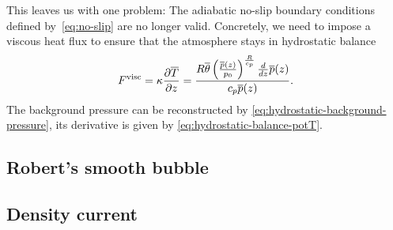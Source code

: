 This leaves us with one problem:
The adiabatic no-slip boundary conditions defined by~\vref{eq:no-slip} are no longer valid.
Concretely, we need to impose a viscous heat flux to ensure that the atmosphere stays in hydrostatic balance~\cite{giraldo2008study}
\begin{equation}
  \label{eq:atmosphere-bc}
  F^\text{visc} = \kappa \pdv{\overline{T}}{z} =
\frac{R \overline{\theta} \left(\frac{\overline{p}{\left (z \right )}}{p_{0}}\right)^{\frac{R}{c_{p}}} \frac{d}{d z} \overline{p}{\left (z \right )}}{c_{p} \overline{p}{\left (z \right )}}.
\end{equation}
The background pressure can be reconstructed by \cref{eq:hydrostatic-background-pressure}, its derivative is given by \cref{eq:hydrostatic-balance-potT}.

\subsection{Robert's smooth bubble}
\cite{robert1993bubble}
\subsection{Density current}
\cite{straka1993numerical}
